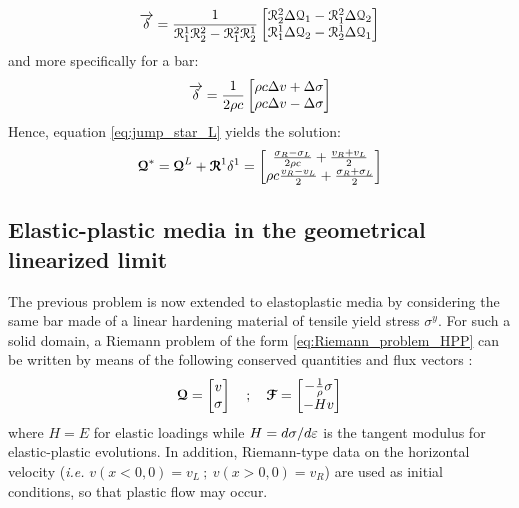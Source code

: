 \begin{equation}
  \label{eq:wave_strengths}
  {\overrightarrow{\delta}} = \frac{1}{\mathcal{R}^1_1\mathcal{R}^2_2 -\mathcal{R}_1^2\mathcal{R}^1_2}\left[\begin{matrix}\mathcal{R}^2_2\Delta \mathcal{Q}_1 - \mathcal{R}^2_1\Delta \mathcal{Q}_2 \\ \mathcal{R}^1_1\Delta \mathcal{Q}_2 - \mathcal{R}_2^1\Delta \mathcal{Q}_1\end{matrix}\right]
\end{equation}
and more specifically for a bar:
\begin{equation}
  \label{eq:wave_strengths_bar}
  {\overrightarrow{\delta}} = \frac{1}{2\rho c}\left[\begin{matrix}\rho c \Delta v + \Delta \sigma \\  \rho c \Delta v -\Delta \sigma \end{matrix}\right]
\end{equation}
Hence, equation \eqref{eq:jump_star_L} yields the solution:
\begin{equation}
  \label{eq:solution_charac_variables}
  {\boldsymbol{\mathcal{Q}}}^* = {\boldsymbol{\mathcal{Q}}}^L +{\boldsymbol{\mathcal{R}}}^1 \delta^1 = \left[\begin{matrix}\frac{\sigma_R - \sigma_L}{2\rho c} + \frac{v_R+v_L}{2} \\ \rho c\frac{v_R - v_L}{2} + \frac{\sigma_R+\sigma_L}{2}\end{matrix}\right] 
\end{equation}


\subsection{Elastic-plastic media in the geometrical linearized limit}
\label{subsec:elasto-plastic_problem}
The previous problem is now extended to elastoplastic media by considering the same bar made of a linear hardening material of tensile yield stress $\sigma^y$. For such a solid domain, a Riemann problem of the form \eqref{eq:Riemann_problem_HPP} can be written by means of the following conserved quantities and flux vectors \cite{Thomas_EP}:
\begin{equation*}
  {\boldsymbol{\mathcal{Q}}} = \left[\begin{matrix}v \\ \sigma\end{matrix}\right] \quad ; \quad {\boldsymbol{\mathcal{F}}} = \left[\begin{matrix}-\frac{1}{\rho}\sigma \\ -Hv\end{matrix}\right]
\end{equation*}
where $H=E$ for elastic loadings while $H=d\sigma/d\varepsilon$ is the tangent modulus for elastic-plastic evolutions. In addition, Riemann-type data on the horizontal velocity (\textit{i.e. }$v(x<0,0)=v_L\:;\:v(x>0,0)=v_R$) are used as initial conditions, so that plastic flow may occur.

